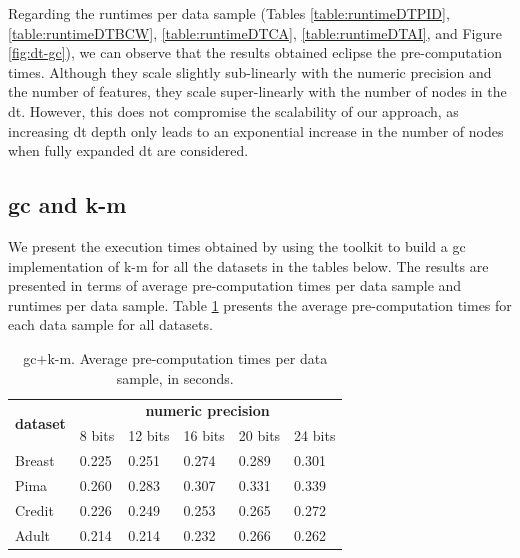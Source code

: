 Regarding the runtimes per data sample (Tables \ref{table:runtimeDTPID}, \ref{table:runtimeDTBCW}, \ref{table:runtimeDTCA}, \ref{table:runtimeDTAI}, and Figure \ref{fig:dt-gc}), we can observe that the results obtained eclipse the pre-computation times. Although they scale slightly sub-linearly with the numeric precision and the number of features, they scale super-linearly with the number of nodes in the \ac{dt}. However, this does not compromise the scalability of our approach, as increasing \ac{dt} depth only leads to an exponential increase in the number of nodes when fully expanded \ac{dt} are considered.


\subsection{\acl{gc} and \acl{k-m}}
\label{ssec:gcandKM}


We present the execution times obtained by using the toolkit to build a \ac{gc} implementation of \ac{k-m} for all the datasets in the tables below. The results are presented in terms of average pre-computation times per data sample and runtimes per data sample. Table \ref{table:avgKMAllDatasets} presents the average pre-computation times for each data sample for all datasets.

\begin{table}[htp]
\centering
\caption{\acs{gc}+\acs{k-m}. Average pre-computation times per data sample, in seconds.}
\label{table:avgKMAllDatasets}
\begin{tabular}{|l|l|l|l|l|l|}
\hline
\multirow{2}{*}{\textbf{dataset}} & \multicolumn{5}{c|}{\textbf{numeric precision}}                                             \\ \cline{2-6} 
                                  & 8 bits & 12 bits & 16 bits & 20 bits & 24 bits \\ \hline
Breast                            & 0.225           & 0.251            & 0.274            & 0.289            & 0.301            \\ \hline
Pima                              & 0.260           & 0.283            & 0.307            & 0.331            & 0.339            \\ \hline
Credit                            & 0.226           & 0.249            & 0.253            & 0.265            & 0.272            \\ \hline
Adult                             & 0.214           & 0.214            & 0.232            & 0.266            & 0.262            \\ \hline
\end{tabular}
\end{table}

